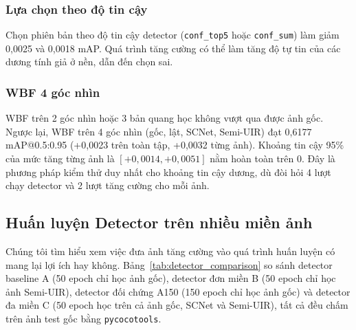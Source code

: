 \documentclass[runningheads]{llncs}
\begin{document}
\subsubsection{Lựa chọn theo độ tin cậy}
Chọn phiên bản theo độ tin cậy detector (\texttt{conf\_top5} hoặc \texttt{conf\_sum}) làm giảm 0,0025 và 0,0018 mAP. Quá trình tăng cường có thể làm tăng độ tự tin của các dương tính giả ở nền, dẫn đến chọn sai.

\subsubsection{WBF 4 góc nhìn}
WBF trên 2 góc nhìn hoặc 3 bản quang học không vượt qua được ảnh gốc. Ngược lại, WBF trên 4 góc nhìn (gốc, lật, SCNet, Semi-UIR) đạt 0,6177 mAP@0.5:0.95 (+0,0023 trên toàn tập, +0,0032 từng ảnh). Khoảng tin cậy 95\% của mức tăng từng ảnh là $[+0{,}0014, +0{,}0051]$ nằm hoàn toàn trên 0. Đây là phương pháp kiểm thử duy nhất cho khoảng tin cậy dương, dù đòi hỏi 4 lượt chạy detector và 2 lượt tăng cường cho mỗi ảnh.

\subsection{Huấn luyện Detector trên nhiều miền ảnh}
\label{sec:res-domains}

Chúng tôi tìm hiểu xem việc đưa ảnh tăng cường vào quá trình huấn luyện có mang lại lợi ích hay không. Bảng~\ref{tab:detector_comparison} so sánh detector baseline A (50 epoch chỉ học ảnh gốc), detector đơn miền B (50 epoch chỉ học ảnh Semi-UIR), detector đối chứng A150 (150 epoch chỉ học ảnh gốc) và detector đa miền C (50 epoch học trên cả ảnh gốc, SCNet và Semi-UIR), tất cả đều chấm trên ảnh test gốc bằng \texttt{pycocotools}.

\begin{table}[t]
    \centering
    \caption{So sánh các detector YOLO11n đánh giá trên ảnh test gốc RUOD (\texttt{pycocotools}).}
    \label{tab:detector_comparison}
\end{table}
\end{document}
